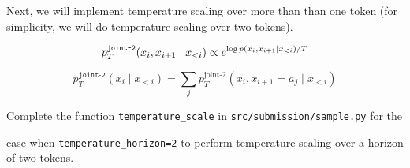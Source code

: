\item {}

Next, we will implement temperature scaling over more than than one token (for simplicity, we will do
temperature scaling over two tokens).

\begin{equation} \label{eq:17}
    p_{T}^{\texttt{joint-2}} (x_i, x_{i+1} \mid x_{<i}) \propto e^{\log p(x_i,x_{i+1} \mid x_{<i})/T} \\
\end{equation}

\begin{equation} \label{eq:18}
    p_{T}^{\texttt{joint-2}} (x_i \mid x_{<i}) = \sum_{j} p_{T}^{\text{joint-2}} (x_i, x_{i+1} = a_j \mid x_{<i})
\end{equation}

Complete the function \texttt{temperature\_scale} in \texttt{src/submission/sample.py} for the 

case when \texttt{temperature\_horizon=2} 
to perform temperature scaling over a horizon of two tokens.